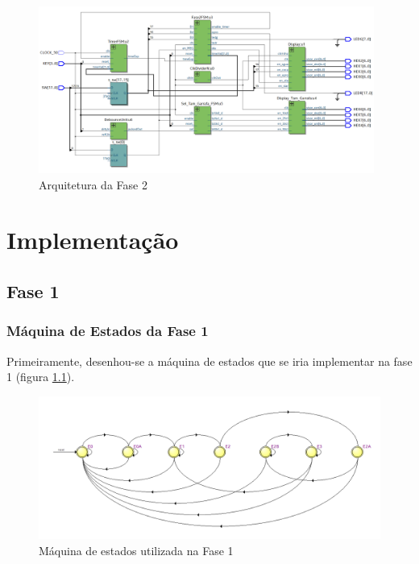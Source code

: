 \documentclass{report}
\begin{document}
\begin{figure}[H]
    \centering
    \includegraphics[width = 11cm]{ArquiteturaFase2.png}
    \caption{Arquitetura da Fase 2}
    \label{fig:Fase2Estrutura}
\end{figure}
 


\chapter{Implementação}
\label{chap.implementação}

\section{Fase 1}

\subsection{Máquina de Estados da Fase 1}

Primeiramente, desenhou-se a máquina de estados que se iria implementar na fase 1 (figura \ref{fig:Fase1FSM}). 

\begin{figure}[H]
    \centering
    \includegraphics[width = \textwidth]{FSM1.png}
    \caption{Máquina de estados utilizada na Fase 1}
    \label{fig:Fase1FSM}
\end{figure}
\end{document}

